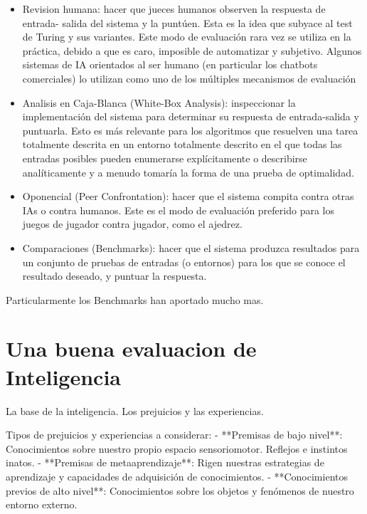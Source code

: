 \begin{itemize}
\item Revision humana: hacer que jueces humanos observen la respuesta de entrada- salida del sistema y la puntúen. Esta es la idea que subyace al test de Turing y sus variantes. Este modo de evaluación rara vez se utiliza en la práctica, debido a que es caro, imposible de automatizar y subjetivo. Algunos sistemas de IA orientados al ser humano (en particular los chatbots comerciales) lo utilizan como uno de los múltiples mecanismos de evaluación

\item Analisis en Caja-Blanca (White-Box Analysis): inspeccionar la implementación del sistema para determinar su respuesta de entrada-salida y puntuarla. Esto es más relevante para los algoritmos que resuelven una tarea totalmente descrita en un entorno totalmente descrito en el que todas las entradas posibles pueden enumerarse explícitamente o describirse analíticamente y a menudo tomaría la forma de una prueba de optimalidad.

\item Oponencial (Peer Confrontation): hacer que el sistema compita contra otras IAs o contra humanos. Este es el modo de evaluación preferido para los juegos de jugador contra jugador, como el ajedrez.

\item Comparaciones (Benchmarks): hacer que el sistema produzca resultados para un conjunto de pruebas de entradas (o entornos) para los que se conoce el resultado deseado, y puntuar la respuesta.
\end{itemize}

Particularmente los Benchmarks han aportado mucho mas. 

\section{Una buena evaluacion de Inteligencia}\label{section:state-of-the-art:a-good-measure-of-inteligence}

La base de la inteligencia. Los prejuicios y las experiencias.

Tipos de prejuicios y experiencias a considerar:
- **Premisas de bajo nivel**: Conocimientos sobre nuestro propio espacio sensoriomotor. Reflejos e instintos inatos.
- **Premisas de metaaprendizaje**: Rigen nuestras estrategias de aprendizaje y capacidades de adquisición de conocimientos.
- **Conocimientos previos de alto nivel**: Conocimientos sobre los objetos y fenómenos de nuestro entorno externo.

